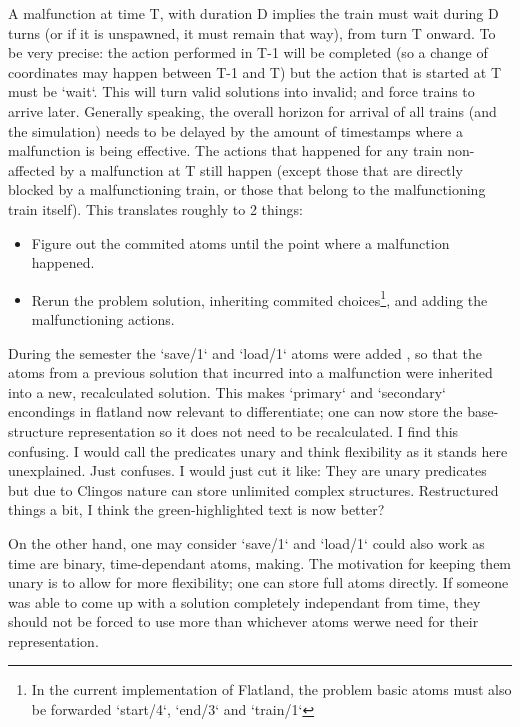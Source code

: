 A malfunction at time T, with duration D implies the train must wait during D turns (or if it is unspawned, it must remain that way), from turn T onward. To be very precise: the action performed in T-1 will be completed (so a change of coordinates may happen between T-1 and T) but the action that is started at T must be `wait`. This will turn valid solutions into invalid; and force trains to arrive later. Generally speaking, the overall horizon for arrival of all trains (and the simulation) needs to be delayed by the amount of timestamps where a malfunction is being effective. The actions that happened for any train non-affected by a malfunction at T still happen (except those that are directly blocked by a malfunctioning train, or those that belong to the malfunctioning train itself). This translates roughly to 2 things:
\begin{itemize}
	\item Figure out the commited atoms until the point where a malfunction happened.
	\item Rerun the problem solution, inheriting commited choices\footnote{In the current implementation of Flatland, the problem basic atoms must also be forwarded `start/4`, `end/3` and `train/1`}, and adding the malfunctioning actions.
\end{itemize}
During the semester the `save/1`  and `load/1` atoms were added \cite{malfunction_branch}, so that the atoms from a previous solution that incurred into a malfunction were inherited into a new, recalculated solution. \color{green} This makes `primary` and `secondary` encondings in flatland now relevant to differentiate; one can now store the base-structure representation so it does not need to be recalculated. \color{black} \color{gray} I find this confusing. I would call the predicates unary and think flexibility as it stands here unexplained. Just confuses. I would just cut it like: They are unary predicates but due to Clingos nature can store unlimited complex structures. 
\color{red} Restructured things a bit, I think the green-highlighted text is now better?

\color{black}

On the other hand, one may consider `save/1`  and `load/1` could also work as time are binary, time-dependant atoms, making. The motivation for keeping them unary is to allow for more flexibility; one can store full atoms directly. If someone was able to come up with a solution completely independant from time, they should not be forced to use more than whichever atoms werwe need for their representation.


